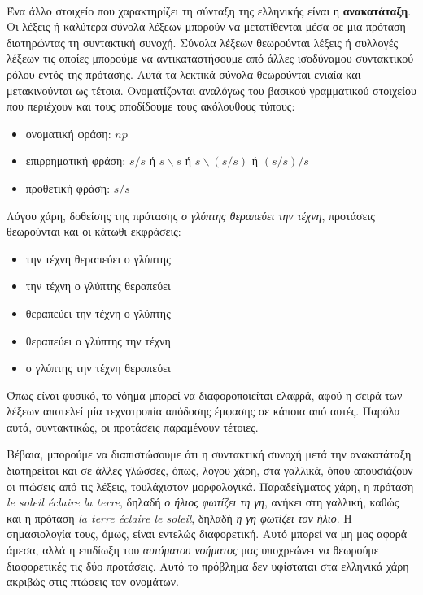 \documentclass [a4paper,11pt] {book}
\theoremstyle{definition}
\theoremstyle{definition}
\begin{document}
\paragraph{}
Ένα άλλο στοιχείο που χαρακτηρίζει τη σύνταξη της ελληνικής είναι η \textbf{ανακατάταξη}. Οι λέξεις ή καλύτερα σύνολα λέξεων μπορούν να μετατίθενται μέσα σε μια πρόταση διατηρώντας τη συντακτική συνοχή. Σύνολα λέξεων θεωρούνται λέξεις ή συλλογές λέξεων τις οποίες μπορούμε να αντικαταστήσουμε από άλλες ισοδύναμου συντακτικού ρόλου εντός της πρότασης. Αυτά τα λεκτικά σύνολα θεωρούνται ενιαία και μετακινούνται ως τέτοια. Ονοματίζονται αναλόγως του βασικού γραμματικού στοιχείου που περιέχουν και τους αποδίδουμε τους ακόλουθους τύπους:
\begin{itemize}\renewcommand*\labelitemi{$\circ$}
\item ονοματική φράση: $np$
\item επιρρηματική φράση: $s/s$ ή $s\backslash s$ ή $s\backslash (s/s)$ ή $(s/s)/s$
\item προθετική φράση: $s/s$
\end{itemize}
Λόγου χάρη, δοθείσης της πρότασης \textit{ο γλύπτης θεραπεύει την τέχνη}, προτάσεις θεωρούνται και οι κάτωθι εκφράσεις:
\begin{itemize}
\item την τέχνη θεραπεύει ο γλύπτης
\item την τέχνη ο γλύπτης θεραπεύει
\item θεραπεύει την τέχνη ο γλύπτης
\item θεραπεύει ο γλύπτης την τέχνη
\item ο γλύπτης την τέχνη θεραπεύει
\end{itemize}
Όπως είναι φυσικό, το νόημα μπορεί να διαφοροποιείται ελαφρά, αφού η σειρά των λέξεων αποτελεί μία τεχνοτροπία απόδοσης έμφασης σε κάποια από αυτές. Παρόλα αυτά, συντακτικώς, οι προτάσεις παραμένουν τέτοιες.

Βέβαια, μπορούμε να διαπιστώσουμε ότι η συντακτική συνοχή μετά την ανακατάταξη διατηρείται και σε άλλες γλώσσες, όπως, λόγου χάρη, στα γαλλικά, όπου απουσιάζουν οι πτώσεις από τις λέξεις, τουλάχιστον μορφολογικά. Παραδείγματος χάρη, η πρόταση \textit{le soleil éclaire la terre}, δηλαδή \textit{ο ήλιος φωτίζει τη γη}, ανήκει στη γαλλική, καθώς και η πρόταση \textit{la terre éclaire le soleil}, δηλαδή \textit{η γη φωτίζει τον ήλιο}. Η σημασιολογία τους, όμως, είναι εντελώς διαφορετική. Αυτό μπορεί να μη μας αφορά άμεσα, αλλά η επιδίωξη του \textit{αυτόματου νοήματος} μας υποχρεώνει να θεωρούμε διαφορετικές τις δύο προτάσεις. Αυτό το πρόβλημα δεν υφίσταται στα ελληνικά χάρη ακριβώς στις πτώσεις τον ονομάτων.
\end{document}
